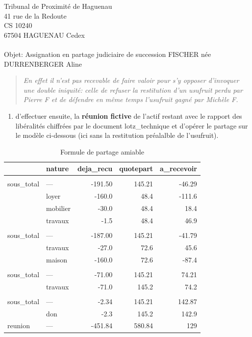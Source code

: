 \documentclass[
]{letter}
\providecommand{\tightlist}{%
  \setlength{\itemsep}{0pt}\setlength{\parskip}{0pt}}\usepackage{longtable,booktabs,array}
\begin{document}
\begin{letter}{Tribunal de Proximité de Haguenau\\41 rue de la
Redoute\\CS 10240\\67504 HAGUENAU Cedex\\ ~ \\Objet: Assignation en
partage judiciaire de succession FISCHER née DURRENBERGER Aline}
\begin{quote}
\emph{En effet il n'est pas recevable de faire valoir pour s'y opposer
d'invoquer une double iniquité: celle de refuser la restitution d'un
usufruit perdu par Pierre F et de défendre en même temps l'usufruit
gagné par Michèle F.}
\end{quote}

\begin{enumerate}
\def\labelenumi{\arabic{enumi}.}
\setcounter{enumi}{1}
\tightlist
\item
  d'effectuer ensuite, la \textbf{réunion fictive} de l'actif restant
  avec le rapport des libéralités chiffrées par le document
  lotz\_technique et d'opérer le partage sur le modèle ci-dessous (ici
  sans la restitution préalalble de l'usufruit).
\end{enumerate}

\begin{table}
\caption*{
{\fontsize{20}{25}\selectfont  Formule de partage amiable\fontsize{12}{15}\selectfont }
} 
\fontsize{12.0pt}{14.0pt}\selectfont
\begin{tabular*}{\linewidth}{@{\extracolsep{\fill}}l|lrrr}
\toprule
 & nature & deja\_recu & quotepart & a\_recevoir \\ 
\midrule\addlinespace[2.5pt]
\multicolumn{5}{l}{michèle} \\[2.5pt] 
\midrule\addlinespace[2.5pt]
sous\_total & — & -191.50 & 145.21 & -46.29 \\ 
\midrule 
 & loyer & -160.0 & 48.4 & -111.6 \\ 
 & mobilier & -30.0 & 48.4 & 18.4 \\ 
 & travaux & -1.5 & 48.4 & 46.9 \\ 
\midrule\addlinespace[2.5pt]
\multicolumn{5}{l}{marguerite} \\[2.5pt] 
\midrule\addlinespace[2.5pt]
sous\_total & — & -187.00 & 145.21 & -41.79 \\ 
\midrule 
 & travaux & -27.0 & 72.6 & 45.6 \\ 
 & maison & -160.0 & 72.6 & -87.4 \\ 
\midrule\addlinespace[2.5pt]
\multicolumn{5}{l}{aline} \\[2.5pt] 
\midrule\addlinespace[2.5pt]
sous\_total & — & -71.00 & 145.21 & 74.21 \\ 
\midrule 
 & travaux & -71.0 & 145.2 & 74.2 \\ 
\midrule\addlinespace[2.5pt]
\multicolumn{5}{l}{pierre} \\[2.5pt] 
\midrule\addlinespace[2.5pt]
sous\_total & — & -2.34 & 145.21 & 142.87 \\ 
\midrule 
 & don & -2.3 & 145.2 & 142.9 \\ 
\midrule 
\midrule 
reunion & — & -451.84 & 580.84 & 129 \\ 
\bottomrule
\end{tabular*}
\end{table}


\end{letter}
\end{document}
